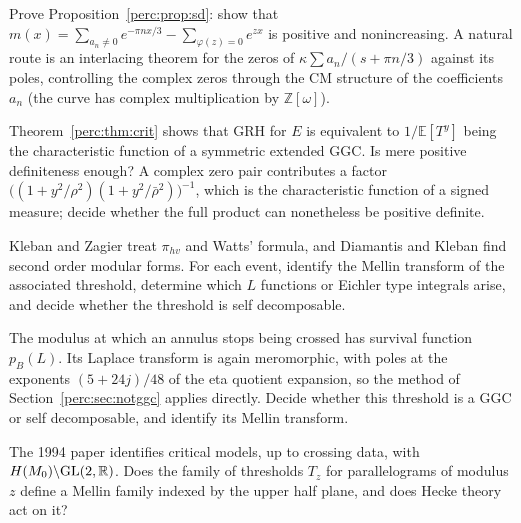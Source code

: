 \begin{compproblem}
Prove Proposition~\ref{perc:prop:sd}: show that $m(x) = \sum_{a_n\ne0}e^{-\pi nx/3}-\sum_{\varphi(z)=0}e^{zx}$ is positive and nonincreasing. A natural route is an interlacing theorem for the zeros of $\kappa\sum a_n/(s+\pi n/3)$ against its poles, controlling the complex zeros through the CM structure of the coefficients $a_n$ (the curve has complex multiplication by $\mathbb{Z}[\omega]$).
\end{compproblem}

\begin{compproblem}
Theorem~\ref{perc:thm:crit} shows that GRH for $E$ is equivalent to $1/\mathbb{E}[T^y]$ being the characteristic function of a symmetric extended GGC. Is mere positive definiteness enough? A complex zero pair contributes a factor $\big((1+y^2/\rho^2)(1+y^2/\bar\rho^2)\big)^{-1}$, which is the characteristic function of a signed measure; decide whether the full product can nonetheless be positive definite.
\end{compproblem}

\begin{compproblem}
Kleban and Zagier treat $\pi_{hv}$ and Watts' formula, and Diamantis and Kleban find second order modular forms. For each event, identify the Mellin transform of the associated threshold, determine which $L$ functions or Eichler type integrals arise, and decide whether the threshold is self decomposable.
\end{compproblem}

\begin{compproblem}
The modulus at which an annulus stops being crossed has survival function $p_B(L)$. Its Laplace transform is again meromorphic, with poles at the exponents $(5+24j)/48$ of the eta quotient expansion, so the method of Section~\ref{perc:sec:notggc} applies directly. Decide whether this threshold is a GGC or self decomposable, and identify its Mellin transform.
\end{compproblem}

\begin{compproblem}
The 1994 paper identifies critical models, up to crossing data, with $H(M_0)\backslash\mathrm{GL}(2,\mathbb{R})$. Does the family of thresholds $T_z$ for parallelograms of modulus $z$ define a Mellin family indexed by the upper half plane, and does Hecke theory act on it?
\end{compproblem}

